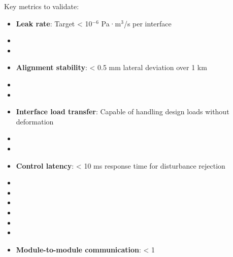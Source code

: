Key metrics to validate:
\begin{itemize}
    \item \textbf{Leak rate}: Target < 10$^{-6}$ Pa·m$^3$/s per interface \cite{holland2004}
    \item \item \item \textbf{Alignment stability}: < 0.5 mm lateral deviation over 1 km
    \item \item \item \textbf{Interface load transfer}: Capable of handling design loads without deformation
    \item \item \item \textbf{Control latency}: < 10 ms response time for disturbance rejection \cite{astrom2008}
    \item \item \item \item \item \item \item \textbf{Module-to-module communication}: < 1%
\end{itemize}

